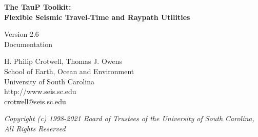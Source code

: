 
\begin{titlepage}
\begin{center}

\vspace{2in}

\LARGE
\textbf{
The TauP Toolkit: \\
Flexible Seismic Travel-Time and Raypath Utilities \\
}

\large
Version 2.6 \\
Documentation

\vspace{3in}

H. Philip Crotwell, Thomas J. Owens \\
School of Earth, Ocean and Environment \\
University of South Carolina \\
http://www.seis.sc.edu \\
crotwell@seis.sc.edu

\vspace{3in}

\textit{
\normalsize
Copyright (c) 1998-2021 Board of Trustees of the University of South Carolina, \\
All Rights Reserved
\normalsize}

\end{center}
\end{titlepage}
